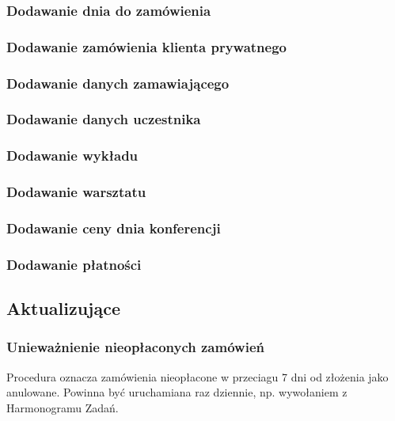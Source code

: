 \documentclass[12pt]{article}
\begin{document}
\subsubsection{Dodawanie dnia do zamówienia}


\subsubsection{Dodawanie zamówienia klienta prywatnego}


\subsubsection{Dodawanie danych zamawiającego}


\subsubsection{Dodawanie danych uczestnika}


\subsubsection{Dodawanie wykładu}


\subsubsection{Dodawanie warsztatu}


\subsubsection{Dodawanie ceny dnia konferencji}


\subsubsection{Dodawanie płatności}


\subsection{Aktualizujące}
\subsubsection{Unieważnienie nieopłaconych zamówień}
Procedura oznacza zamówienia nieopłacone w przeciagu 7 dni od złożenia jako anulowane.
Powinna być uruchamiana raz dziennie, np. wywołaniem z Harmonogramu Zadań.
\end{document}
